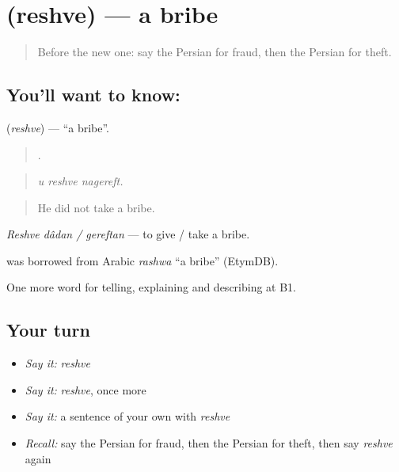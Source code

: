 \section[\texorpdfstring{\fa{رشوه} (reshve)}{رشوه (reshve)}]{ (reshve) — a bribe}

\label{lesson:FA-C408-reshve}



\begin{quote}
Before the new one: say the Persian for fraud, then the Persian for theft.
\end{quote}

\subsection*{You'll want to know: }
\textbf{} (\emph{reshve}) — \textquotedblleft{}a bribe\textquotedblright{}.

\begin{quote}
  .
\end{quote}

\begin{quote}
\emph{u reshve nagereft.}
\end{quote}

\begin{quote}
He did not take a bribe.
\end{quote}

\emph{Reshve dâdan / gereftan} — to give / take a bribe.

\begin{cousinweb}
\textbf{} was borrowed from Arabic \emph{rashwa} \textquotedblleft{}a bribe\textquotedblright{} (EtymDB).
\end{cousinweb}

\begin{grammarlens}[title={What you've built}]
One more word for telling, explaining and describing at B1.
\end{grammarlens}

\subsection*{Your turn}
\begin{itemize}
\raggedright
  \item \emph{Say it:} \emph{reshve}
  \item \emph{Say it:} \emph{reshve}, once more
  \item \emph{Say it:} a sentence of your own with \emph{reshve}
  \item \emph{Recall:} say the Persian for fraud, then the Persian for theft, then say \emph{reshve} again
\end{itemize}

